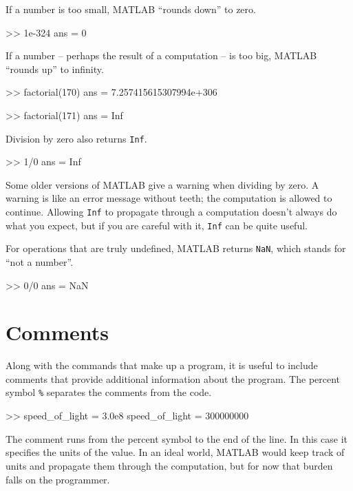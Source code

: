 \documentclass[
]{book}
\numberwithin{Answer}{chapter}
\numberwithin{Exercise}{chapter}
\begin{document}
If a number is too small, MATLAB ``rounds down'' to zero.

\begin{code}
>> 1e-324
ans = 0
\end{code}

If a number -- perhaps the result of a computation -- is too big, 
MATLAB ``rounds up'' to infinity.

\begin{code}
>> factorial(170)
ans = 7.257415615307994e+306

>> factorial(171)
ans = Inf
\end{code}

Division by zero also returns {\tt Inf}.

\begin{code}
>> 1/0
ans = Inf
\end{code}

Some older versions of MATLAB give a warning when dividing by zero.
A warning is like an error message without teeth; the computation
is allowed to continue.  Allowing {\tt Inf} to propagate
through a computation doesn't always do what you expect, but if you
are careful with it, {\tt Inf} can be quite useful.

For operations that are truly undefined, MATLAB returns {\tt NaN},
which stands for ``not a number''.

\begin{code}
>> 0/0
ans = NaN
\end{code}



\section{Comments}

Along with the commands that make up a program, it is useful to include comments that provide additional information about the
program.  The percent symbol {\tt \%} separates
the comments from the code.

\begin{code}
>> speed_of_light = 3.0e8     %
speed_of_light = 300000000
\end{code}

The comment runs from the percent symbol to the end of the line.
In this case it specifies the units of the value.  In an ideal world,
MATLAB would keep track of units and propagate them through the
computation, but for now that burden falls on the programmer.
\end{document}
